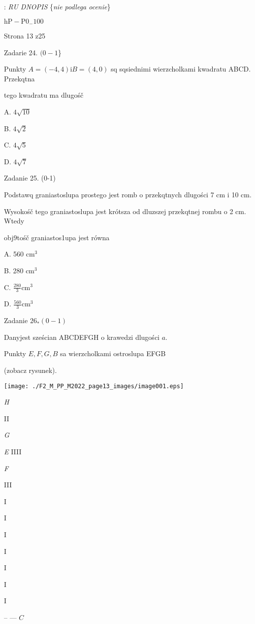 \documentclass[a4paper,12pt]{article}
\begin{document}
: {\it RU DNOPIS} \{{\it nie podlega ocenie}\}

$\mathrm{h}\mathrm{P}-\mathrm{P}0_{-}100$

Strona 13 z25





Zadarie 24. $(0-1$\}

Punkty $A=(-4,4) \mathrm{i} B=(4,0)$ sq sqsiednimi wierzcholkami kwadratu ABCD. Przekqtna

tego kwadratu ma dlugośč

A. $4\sqrt{10}$

B. $4\sqrt{2}$

C. $4\sqrt{5}$

D. $4\sqrt{7}$

Zadanie 25. (0-1)

Podstawq graniastoslupa prostego jest romb o przekqtnych dlugości 7 cm i 10 cm.

Wysokośč tego graniastoslupa jest krótsza od dluzszej przekqtnej rombu o 2 cm. Wtedy

obj9tośč graniastos1upa jest równa

A. 560 $\mathrm{c}\mathrm{m}^{3}$

B. 280 $\mathrm{c}\mathrm{m}^{3}$

C. $\displaystyle \frac{280}{3}\mathrm{c}\mathrm{m}^{3}$

D. $\displaystyle \frac{560}{3}\mathrm{c}\mathrm{m}^{3}$

Zadanie $26_{*}(0-1)$

Danyjest sześcian ABCDEFGH o krawedzi dlugości $a.$

Punkty $E, F, G, B$ sa wierzcholkami ostroslupa EFGB

(zobacz rysunek).
\begin{center}
\texttt{[image: ./F2\_M\_PP\_M2022\_page13\_images/image001.eps]}
\end{center}
{\it H}

II

{\it G}

{\it E}  IIII

{\it F}

III

I

I

I

I

I

I

I

-- --- $C$
\end{document}
